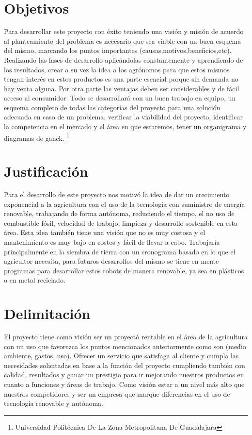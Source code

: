 \documentclass[11pt,a4paper]{article}
\begin{document}
\section{Objetivos}

Para desarrollar este proyecto con éxito teniendo una visión y misión de acuerdo al planteamiento del problema es necesario que sea viable con un buen esquema del mismo, marcando los puntos importantes (causas,motivos,beneficios,etc). Realizando las fases de desarrollo aplicándolas constantemente y aprendiendo de los resultados, crear a su vez la idea a los agrónomos para que estos mismos tengan interés en estos productos es 
una parte esencial porque sin demanda no hay venta alguna. Por otra parte las ventajas deben ser considerables y de fácil acceso al consumidor.
Todo se desarrollará con un buen trabajo en equipo, un esquema completo de todas las categorías del proyecto para una solución adecuada en caso de un problema, verificar la viabilidad del proyecto, identificar la competencia en el mercado y el área en que estaremos, tener un organigrama y diagramas de ganck.
\footnote{Universidad Politécnica De La Zona Metropolitana De Guadalajara} 
\section{Justificación}
 Para el desarrollo de este proyecto nos motivó la idea de dar un crecimiento exponencial a la agricultura con el uso de la tecnología con suministro de energía renovable, trabajando de forma autónoma, reduciendo el tiempo, el no uso de combustible fósil, velocidad de trabajo, limpieza y desarrollo sostenible en esta área. Esta idea también tiene una visión que no es muy costosa y el mantenimiento es muy bajo en costos y fácil de llevar a cabo. Trabajaría principalmente en la siembra de tierra con un cronograma basado en lo que el agricultor necesita, para futuros desarrollos del mismo se tiene en mente programas para desarrollar estos robots de manera renovable, ya sea en plásticos o en metal reciclado.
 
 \section{Delimitación}
 El proyecto tiene como visión ser un proyectó rentable en el área de la agricultura con un uso que favorezca los puntos mencionados anteriormente como son (medio ambiente, gastos, uso). Ofrecer un servicio que satisfaga al cliente y cumpla las necesidades solicitadas en base a la función del proyecto cumpliendo también con calidad, resultados y ganar un prestigio para ir mejorando nuestros productos en cuanto a funciones y áreas de trabajo. Como visión estar a un nivel más alto que nuestros competidores y ser un empresa que marque diferencias en el uso de tecnología renovable y autónoma.
 
\end{document}
